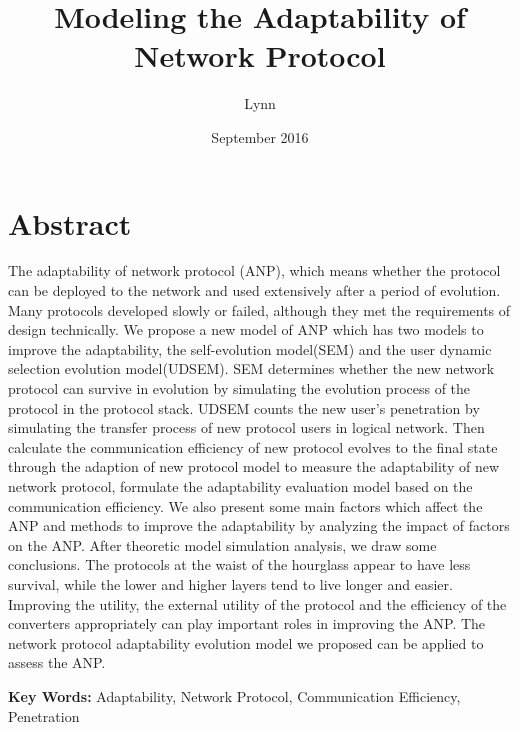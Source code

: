 \documentclass{article}
\title{Modeling the Adaptability of Network Protocol}
\author{Lynn }
\date{September 2016}
\begin{document}
\maketitle

\section*{Abstract}
The adaptability of network protocol (ANP), which means whether the protocol can be deployed to the network 
and used extensively after a period of evolution. Many protocols developed slowly or failed, although they 
met the requirements of design technically. We propose a new model of ANP  which has two models to improve 
the adaptability, the self-evolution model(SEM) and the user dynamic selection evolution model(UDSEM). SEM 
determines whether the new network protocol can survive in evolution by simulating the evolution process of 
the protocol in the protocol stack. UDSEM counts the new user's penetration by simulating the transfer process 
of new protocol users in logical network. Then calculate the communication efficiency of new protocol evolves 
to the final state through the adaption of new protocol model to measure the adaptability of new network protocol, 
formulate the adaptability evaluation model based on the communication efficiency. We also present some main factors 
which affect the ANP and methods to improve the adaptability by analyzing the impact of factors on the ANP.  After 
theoretic model simulation analysis, we draw some conclusions. The protocols at the waist of the hourglass appear 
to have less survival, while the lower and higher layers tend to live longer and easier. Improving the utility, 
the external utility of the protocol and the efficiency of the converters appropriately can play important roles 
in improving the ANP. The network protocol adaptability evolution model we proposed can be applied to assess the ANP.

\setlength{\parskip}{0.5\baselineskip}
\par\noindent \textbf {Key Words:}
Adaptability, Network Protocol, Communication Efficiency, Penetration
\end{document}
